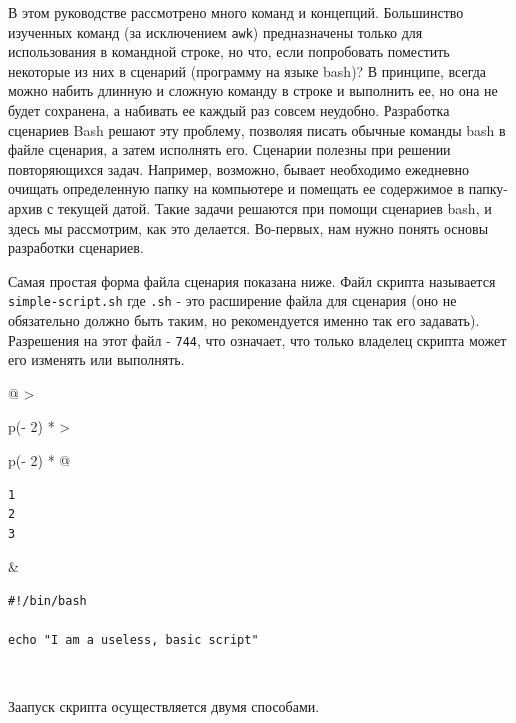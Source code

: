 \documentclass{article}
\begin{document}
В этом руководстве рассмотрено много команд и концепций. Большинство
изученных команд (за исключением \texttt{awk}) предназначены только для
использования в командной строке, но что, если попробовать поместить
некоторые из них в сценарий (программу на языке bash)? В принципе,
всегда можно набить длинную и сложную команду в строке и выполнить ее,
но она не будет сохранена, а набивать ее каждый раз совсем неудобно.
Разработка сценариев Bash решают эту проблему, позволяя писать обычные
команды bash в файле сценария, а затем исполнять его. Сценарии полезны
при решении повторяющихся задач. Например, возможно, бывает необходимо
ежедневно очищать определенную папку на компьютере и помещать ее
содержимое в папку-архив с текущей датой. Такие задачи решаются при
помощи сценариев bash, и здесь мы рассмотрим, как это делается.
Во-первых, нам нужно понять основы разработки сценариев.

Самая простая форма файла сценария показана ниже. Файл скрипта
называется \texttt{simple-script.sh} где \texttt{.sh} - это расширение
файла для сценария (оно не обязательно должно быть таким, но
рекомендуется именно так его задавать). Разрешения на этот файл -
\texttt{744}, что означает, что только владелец скрипта может его
изменять или выполнять.

\begin{longtable}[]{@{}
  >{\raggedright\arraybackslash}p{(\columnwidth - 2\tabcolsep) * }
  >{\raggedright\arraybackslash}p{(\columnwidth - 2\tabcolsep) * }@{}}
\toprule
\endhead
\begin{minipage}[t]{\linewidth}\raggedright
\begin{verbatim}
1
2
3
\end{verbatim}
\end{minipage} & \begin{minipage}[t]{\linewidth}\raggedright
\begin{verbatim}
#!/bin/bash

echo "I am a useless, basic script"
\end{verbatim}
\end{minipage} \\ \addlinespace
\bottomrule
\end{longtable}

Заапуск скрипта осуществляется двумя способами.
\end{document}
